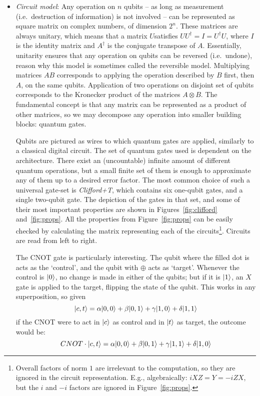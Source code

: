 \begin{itemize}

\item \textit{Circuit model}: Any operation on \(n\) qubits -- as long as measurement (i.e.\ destruction of information) is not involved -- can be represented as square matrix on complex numbers, of dimension \(2^n\). These matrices are always unitary, which means that a matrix \(U\)satisfies \(UU^\dag = I = U^\dag U\), where \(I\) is the identity matrix and \(A^\dag\) is the conjugate transpose of \(A\). Essentially, unitarity ensures that any operation on qubits can be reversed (i.e.\ undone), reason why this model is sometimes called the reversible model. Multiplying matrices \(AB\) corresponds to applying the operation described by \(B\) first, then \(A\), on the same qubits. Application of two operations on disjoint set of qubits corresponds to the Kronecker product of the matrices \(A \otimes B\). The fundamental concept is that any matrix can be represented as a product of other matrices, so we may decompose any operation into smaller building blocks: quantum gates.

Qubits are pictured as wires to which quantum gates are applied, similarly to a classical digital circuit. The set of quantum gates used is dependent on the architecture. There exist an (uncountable) infinite amount of different quantum operations, but a small finite set of them is enough to approximate any of them up to a desired error factor. The most common choice of such a universal gate-set is \textit{Clifford+T}, which contains six one-qubit gates, and a single two-qubit gate. The depiction of the gates in that set, and some of their most important properties are shown in Figures~\ref{fig:clifford} and~\ref{fig:props}. All the properties from Figure~\ref{fig:props} can be easily checked by calculating the matrix representing each of the circuits\footnote{Overall factors of norm \(1\) are irrelevant to the computation, so they are ignored in the circuit representation. E.g., algebraically: \(iXZ = Y = -iZX\), but the \(i\) and \(-i\) factors are ignored in Figure~\ref{fig:props}.}. Circuits are read from left to right.






The CNOT gate is particularly interesting. The qubit where the filled dot is acts as the `control', and the qubit with \(\oplus\) acts as `target'. Whenever the control is \(\vert 0 \rangle\), no change is made in either of the qubits; but if it is \(\vert 1 \rangle\), an \(X\) gate is applied to the target, flipping the state of the qubit. This works in any superposition, so given \[\vert c,t \rangle = \alpha\vert 0,0 \rangle + \beta\vert 0,1 \rangle + \gamma\vert 1,0 \rangle + \delta\vert 1,1 \rangle\] if the CNOT were to act in \(\vert c \rangle\) as control and in \(\vert t \rangle\) as target, the outcome would be: \[CNOT \cdot \vert c,t \rangle = \alpha\vert 0,0 \rangle + \beta\vert 0,1 \rangle + \gamma\vert 1,1 \rangle + \delta\vert 1,0 \rangle\]


\end{itemize}
